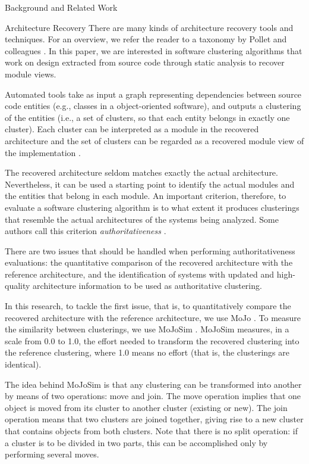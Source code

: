 \documentclass[11pt,twocolumn,a4paper,english]{article}
\begin{document}
\begin{section}{Background and Related Work}
\begin{subsection}{Architecture Recovery}
	There are many kinds of architecture recovery tools and techniques. For an overview, we refer the reader to a taxonomy by Pollet and colleagues \cite{Pollet2007}. In this paper, we are interested in software clustering algorithms that work on design extracted from source code through static analysis to recover module views. 
	
Automated tools take as input a graph representing dependencies between source code entities (e.g., classes in a object-oriented software), and outputs a clustering of the entities (i.e., a set of clusters, so that each entity belongs in exactly one cluster). Each cluster can be interpreted as a module in the recovered architecture and the set of clusters can be regarded as a recovered module view of the implementation \cite{Mancoridis1998}.

	The recovered architecture seldom matches exactly the actual architecture. Nevertheless, it can be used a starting point to identify the actual modules and the entities that belong in each module. 
%
	An important criterion, therefore, to evaluate a software clustering algorithm is to what extent it produces clusterings that resemble the actual architectures of the systems being analyzed. Some authors call this criterion \textit{authoritativeness} \cite{Wu2005,Bittencourt2009}.
	
	There are two issues that should be handled when performing authoritativeness evaluations:
the quantitative comparison of the recovered architecture with the reference architecture, and 
the identification of systems with updated and high-quality architecture information to be used as authoritative clustering.
	
	In this research, to tackle the first issue, that is, to quantitatively compare the recovered architecture with the reference architecture, we use MoJo \cite{Tzerpos1999}. To measure the similarity between clusterings, we use MoJoSim \cite{Bittencourt2009}.
MoJoSim measures, in a scale from 0.0 to 1.0, the effort needed to transform the recovered clustering into the reference clustering, where 1.0 means no effort (that is, the clusterings are identical).
	
	The idea behind MoJoSim is that any clustering can be transformed into another by means of two operations: move and join. The move operation implies that one object is moved from its cluster to another cluster (existing or new). The join operation means that two clusters are joined together, giving rise to a new cluster that contains objects from both clusters. Note that there is no split operation: if a cluster is to be divided in two parts, this can be accomplished only by performing several moves.
	

\end{subsection}
\end{section}
\end{document}
